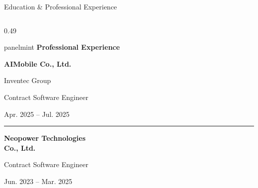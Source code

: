 \documentclass[aspectratio=169,10pt]{beamer}
\begin{document}
\begin{frame}{Education \& Professional Experience}
\begin{columns}[T,onlytextwidth]
\begin{column}{0.49\textwidth}
\begin{beamercolorbox}[
        rounded=true,sep=0.20cm,wd=\linewidth
      ]{panelmint}
        {\large\bfseries\color{Accent}
          Professional Experience}\par
        \vspace{0.24cm}

        {\normalsize\bfseries
          AIMobile Co., Ltd.}\par
        {\small\color{Muted}
          Inventec Group}\par
        \vspace{0.06cm}
        {\normalsize
          Contract Software Engineer}\par
        \vspace{0.05cm}
        {\small\color{Muted}
          Apr. 2025 -- Jul. 2025}\par

        \vspace{0.26cm}
        {\color{Divider}\rule{0.92\linewidth}{0.4pt}}
        \vspace{0.19cm}

        {\normalsize\bfseries
          Neopower Technologies\\Co., Ltd.}\par
        \vspace{0.06cm}
        {\normalsize
          Contract Software Engineer}\par
        \vspace{0.05cm}
        {\small\color{Muted}
          Jun. 2023 -- Mar. 2025}\par

      \end{beamercolorbox}
    \end{column}

  \end{columns}
\end{frame}
\end{document}
